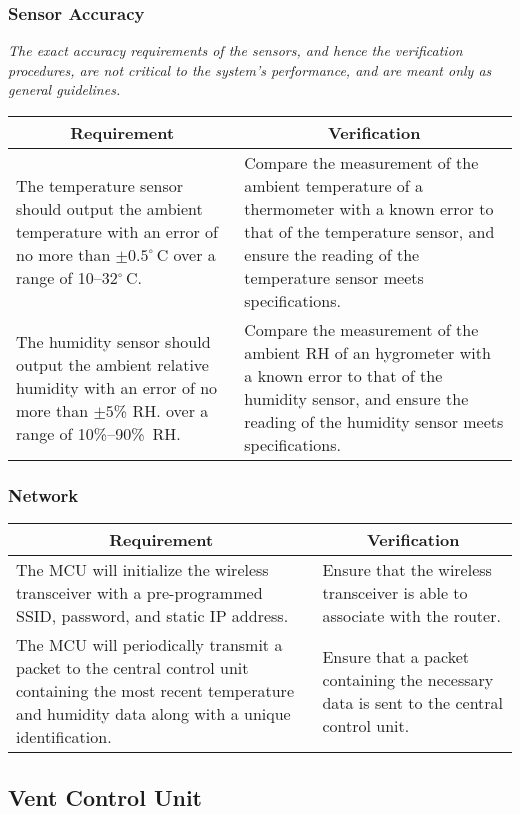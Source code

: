 \subsubsection{Sensor Accuracy}
\label{sensor_acc}
{\em The exact accuracy requirements of the sensors, and hence the verification procedures, are not critical to the system's performance, and are meant only as general guidelines. }

\noindent
\begin{tabular}{|p{\mytabwidth}|p{\mytabwidth}|}
\hline
\multicolumn{1}{|c|}{Requirement} & \multicolumn{1}{|c|}{Verification} \\
\hline\hline
The temperature sensor should output the ambient temperature with an error of no more than $\pm0.5^\circ\,$C over a range of 10--32$^\circ$\,C. &
Compare the measurement of the ambient temperature of a thermometer with a known error to that of the temperature sensor, and ensure the reading of the temperature sensor meets specifications. \\
\hline
The humidity sensor should output the ambient relative humidity with an error of no more than $\pm 5$\% RH. over a range of 10\%--90\%\ RH. &
Compare the measurement of the ambient RH of an hygrometer with a known error to that of the humidity sensor, and ensure the reading of the humidity sensor meets specifications. \\
\hline
\end{tabular}

\subsubsection{Network}
\begin{tabular}{|p{\mytabwidth}|p{\mytabwidth}|}
\hline
\multicolumn{1}{|c|}{Requirement} & \multicolumn{1}{|c|}{Verification} \\
\hline\hline
The MCU will initialize the wireless transceiver with a pre-programmed SSID, password, and static IP address. &
Ensure that the wireless transceiver is able to associate with the router. \\
\hline
The MCU will periodically transmit a packet to the central control unit containing the most recent temperature and humidity data along with a unique identification. &
Ensure that a packet containing the necessary data is sent to the central control unit. \\
\hline
\end{tabular}

\subsection{Vent Control Unit}
